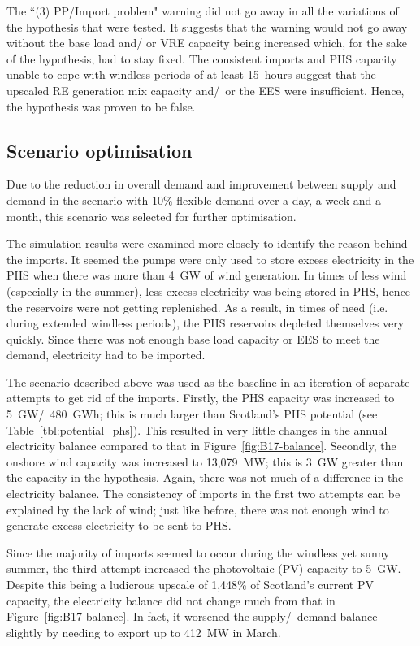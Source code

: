 

The ``(3) PP/Import problem" warning did not go away in all the variations of the hypothesis that were tested.
It suggests that the warning would not go away without the base load and/ or VRE capacity being increased which, for the sake of the hypothesis, had to stay fixed.
The consistent imports and PHS capacity unable to cope with windless periods of at least 15~hours suggest that the upscaled RE generation mix capacity and/~or the EES were insufficient.
Hence, the hypothesis was proven to be false.



\subsection{Scenario optimisation}

Due to the reduction in overall demand and improvement between supply and demand in the scenario with 10\% flexible demand over a day, a week and a month, this scenario was selected for further optimisation.

The simulation results were examined more closely to identify the reason behind the imports.
It seemed the pumps were only used to store excess electricity in the PHS when there was more than 4~GW of wind generation.
In times of less wind (especially in the summer), less excess electricity was being stored in PHS, hence the reservoirs were not getting replenished.
As a result, in times of need (i.e. during extended windless periods), the PHS reservoirs depleted themselves very quickly.
Since there was not enough base load capacity or EES to meet the demand, electricity had to be imported.

The scenario described above was used as the baseline in an iteration of separate attempts to get rid of the imports.
Firstly, the PHS capacity was increased to 5~GW/~480~GWh; this is much larger than Scotland's PHS potential (see Table~\ref{tbl:potential_phs}).
This resulted in very little changes in the annual electricity balance compared to that in Figure~\ref{fig:B17-balance}.
Secondly, the onshore wind capacity was increased to 13,079~MW; this is 3~GW greater than the capacity in the hypothesis.
Again, there was not much of a difference in the electricity balance.
The consistency of imports in the first two attempts can be explained by the lack of wind; just like before, there was not enough wind to generate excess electricity to be sent to PHS.

Since the majority of imports seemed to occur during the windless yet sunny summer, the third attempt increased the photovoltaic (PV) capacity to 5~GW.
Despite this being a ludicrous upscale of 1,448\% of Scotland's current PV capacity, the electricity balance did not change much from that in Figure~\ref{fig:B17-balance}.
In fact, it worsened the supply/~demand balance slightly by needing to export up to 412~MW in March.

